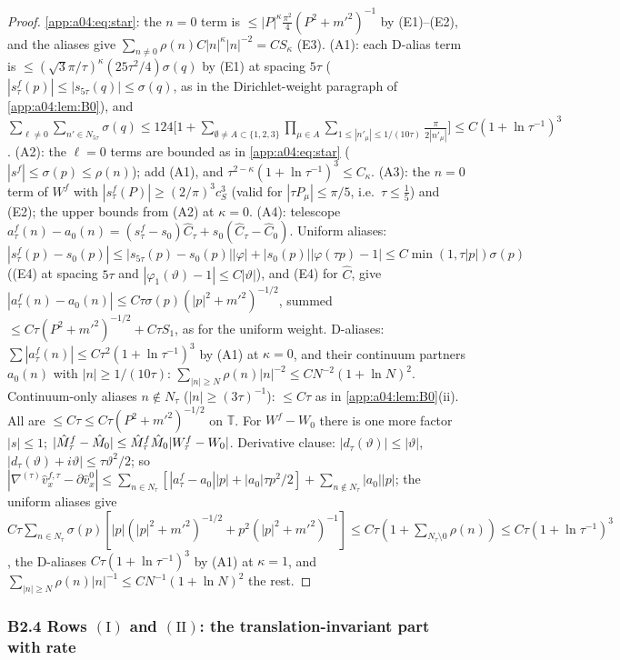 \begin{proof}
\eqref{app:a04:eq:star}: the $n=0$ term is $\le|P|^\kappa\frac{\pi^2}4(P^2+m'^2)^{-1}$ by (E1)--(E2), and the aliases give $\sum_{n\ne0}\rho(n)C|n|^{\kappa}|n|^{-2}=CS_\kappa$ (E3). (A1): each D-alias term is $\le(\sqrt3\pi/\tau)^\kappa(25\tau^2/4)\sigma(q)$ by (E1) at spacing $5\tau$ ($|s^f_\tau(p)|\le|s_{5\tau}(q)|\le\sigma(q)$, as in the Dirichlet-weight paragraph of \cref{app:a04:lem:B0}), and $\sum_{\ell\ne0}\sum_{n'\in N_{5\tau}}\sigma(q)\le124\big[1+\sum_{\emptyset\ne A\subset\{1,2,3\}}\prod_{\mu\in A}\sum_{1\le|n'_\mu|\le1/(10\tau)}\frac\pi{2|n'_\mu|}\big]\le C(1+\ln\tau^{-1})^3$. (A2): the $\ell=0$ terms are bounded as in \eqref{app:a04:eq:star} ($|s^f|\le\sigma(p)\le\rho(n)$); add (A1), and $\tau^{2-\kappa}(1+\ln\tau^{-1})^3\le C_\kappa$. (A3): the $n=0$ term of $W^f$ with $|s^f_\tau(P)|\ge(2/\pi)^3c_S^3$ (valid for $|\tau P_\mu|\le\pi/5$, i.e.\ $\tau\le\frac15$) and (E2); the upper bounds from (A2) at $\kappa=0$. (A4): telescope $a^f_\tau(n)-a_0(n)=(s^f_\tau-s_0)\hat C_\tau+s_0(\hat C_\tau-\hat C_0)$. Uniform aliases: $|s^f_\tau(p)-s_0(p)|\le|s_{5\tau}(p)-s_0(p)||\varphi|+|s_0(p)||\varphi(\tau p)-1|\le C\min(1,\tau|p|)\sigma(p)$ ((E4) at spacing $5\tau$ and $|\varphi_1(\vartheta)-1|\le C|\vartheta|$), and (E4) for $\hat C$, give $|a^f_\tau(n)-a_0(n)|\le C\tau\sigma(p)(|p|^2+m'^2)^{-1/2}$, summed $\le C\tau(P^2+m'^2)^{-1/2}+C\tau S_1$, as for the uniform weight. D-aliases: $\sum|a^f_\tau(n)|\le C\tau^2(1+\ln\tau^{-1})^3$ by (A1) at $\kappa=0$, and their continuum partners $a_0(n)$ with $|n|\ge1/(10\tau)$: $\sum_{|n|\ge N}\rho(n)|n|^{-2}\le CN^{-2}(1+\ln N)^2$. Continuum-only aliases $n\notin N_\tau$ ($|n|\ge(3\tau)^{-1}$): $\le C\tau$ as in \cref{app:a04:lem:B0}(ii). All are $\le C\tau\le C\tau(P^2+m'^2)^{-1/2}$ on $\mathbb T$. For $W^f-W_0$ there is one more factor $|s|\le1$; $|\hat M^f_\tau-\hat M_0|\le\hat M^f_\tau\hat M_0|W^f_\tau-W_0|$. Derivative clause: $|d_\tau(\vartheta)|\le|\vartheta|$, $|d_\tau(\vartheta)+i\vartheta|\le\tau\vartheta^2/2$; so $|\nabla^{(\tau)}\hat v^{f,\tau}_x-\partial\hat v^0_x|\le\sum_{n\in N_\tau}[|a^f_\tau-a_0||p|+|a_0|\tau p^2/2]+\sum_{n\notin N_\tau}|a_0||p|$; the uniform aliases give $C\tau\sum_{n\in N_\tau}\sigma(p)[|p|(|p|^2+m'^2)^{-1/2}+p^2(|p|^2+m'^2)^{-1}]\le C\tau(1+\sum_{N_\tau\setminus0}\rho(n))\le C\tau(1+\ln\tau^{-1})^3$, the D-aliases $C\tau(1+\ln\tau^{-1})^3$ by (A1) at $\kappa=1$, and $\sum_{|n|\ge N}\rho(n)|n|^{-1}\le CN^{-1}(1+\ln N)^2$ the rest.
\end{proof}

\subsubsection*{B2.4 Rows $(\mathrm I)$ and $(\mathrm{II})$: the translation-invariant part with rate}


